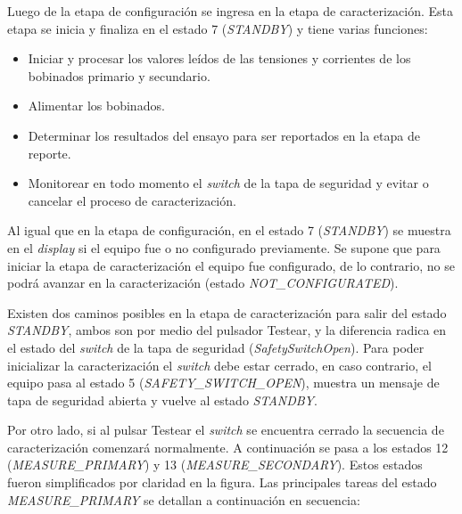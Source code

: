 Luego de la etapa de configuración se ingresa en la etapa de caracterización. Esta etapa se inicia y finaliza en el estado 7 (\textit{STANDBY}) y tiene varias funciones:

\begin{itemize}
\item Iniciar y procesar los valores leídos de las tensiones y corrientes de los bobinados primario y secundario.
\item Alimentar los bobinados.
\item Determinar los resultados del ensayo para ser reportados en la etapa de reporte.
\item Monitorear en todo momento el \textit{switch} de la tapa de seguridad y evitar o cancelar el proceso de caracterización.
\end{itemize}

Al igual que en la etapa de configuración, en el estado 7 (\textit{STANDBY}) se muestra en el \textit{display} si el equipo fue o no configurado previamente. Se supone que para iniciar la etapa de caracterización el equipo fue configurado, de lo contrario, no se podrá avanzar en la caracterización (estado \textit{NOT\_CONFIGURATED}).

Existen dos caminos posibles en la etapa de caracterización para salir del estado \textit{STANDBY}, ambos son por medio del pulsador Testear, y la diferencia radica en el estado del \textit{switch} de la tapa de seguridad (\textit{SafetySwitchOpen}). Para poder inicializar la caracterización el \textit{switch} debe estar cerrado, en caso contrario, el equipo pasa al estado 5 (\textit{SAFETY\_SWITCH\_OPEN}), muestra un mensaje de tapa de seguridad abierta y vuelve al estado \textit{STANDBY}.

Por otro lado, si al pulsar Testear el \textit{switch} se encuentra cerrado la secuencia de caracterización comenzará normalmente. A continuación se pasa a los estados 12 (\textit{MEASURE\_PRIMARY}) y 13 (\textit{MEASURE\_SECONDARY}). Estos estados fueron simplificados por claridad en la figura. Las principales tareas del estado \textit{MEASURE\_PRIMARY} se detallan a continuación en secuencia:

